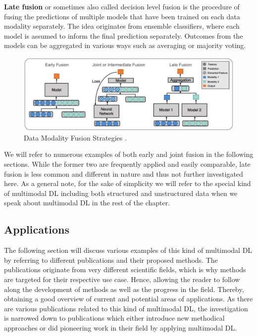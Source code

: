 \documentclass[
]{krantz}
\begin{document}
\textbf{Late fusion} or sometimes also called decision level fusion is the procedure of fusing the predictions of multiple models that have been trained on each data modality separately. The idea originates from ensemble classifiers, where each model is assumed to inform the final prediction separately. Outcomes from the models can be aggregated in various ways such as averaging or majority voting.

\begin{figure}

{\centering \includegraphics[width=1\linewidth]{figures/03-02-struc+unstruc-data/Fusion_Strategies} 

}

\caption{Data Modality Fusion Strategies \citep[Adopted from][]{HuangFusion2020}.}\label{fig:fusion-strategies}
\end{figure}



We will refer to numerous examples of both early and joint fusion in the following sections. While the former two are frequently applied and easily comparable, late fusion is less common and different in nature and thus not further investigated here. As a general note, for the sake of simplicity we will refer to the special kind of multimodal DL including both structured and unstructured data when we speak about multimodal DL in the rest of the chapter.

\hypertarget{applications}{%
\subsection{Applications}\label{applications}}

The following section will discuss various examples of this kind of multimodal DL by referring to different publications and their proposed methods. The publications originate from very different scientific fields, which is why methods are targeted for their respective use case. Hence, allowing the reader to follow along the development of methods as well as the progress in the field. Thereby, obtaining a good overview of current and potential areas of applications. As there are various publications related to this kind of multimodal DL, the investigation is narrowed down to publications which either introduce new methodical approaches or did pioneering work in their field by applying multimodal DL.
\end{document}
